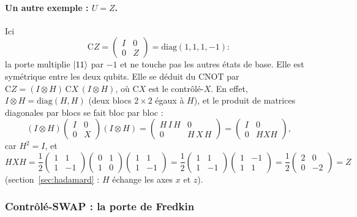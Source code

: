 \paragraph{Un autre exemple : $U=Z$.} Ici
\[
  \mathrm{C}Z=\begin{pmatrix}I&0\\0&Z\end{pmatrix}=\mathrm{diag}(1,1,1,-1) :
\]
la porte multiplie $|11\rangle$ par $-1$ et ne touche pas les autres états de base. Elle est
symétrique entre les deux qubits. Elle se déduit du CNOT par
$\mathrm{C}Z=(I\otimes H)\,\mathrm{C}X\,(I\otimes H)$, où $\mathrm{C}X$ est le contrôlé-$X$.
En effet, $I\otimes H=\mathrm{diag}(H,H)$ (deux blocs $2\times2$ égaux à $H$), et le produit de
matrices diagonales par blocs se fait bloc par bloc :
\[
  (I\otimes H)\begin{pmatrix}I&0\\0&X\end{pmatrix}(I\otimes H)
  =\begin{pmatrix}H\,I\,H&0\\0&H\,X\,H\end{pmatrix}
  =\begin{pmatrix}I&0\\0&HXH\end{pmatrix},
\]
car $H^2=I$, et
\[
  HXH=\frac12\begin{pmatrix}1&1\\1&-1\end{pmatrix}\begin{pmatrix}0&1\\1&0\end{pmatrix}\begin{pmatrix}1&1\\1&-1\end{pmatrix}
  =\frac12\begin{pmatrix}1&1\\1&-1\end{pmatrix}\begin{pmatrix}1&-1\\1&1\end{pmatrix}
  =\frac12\begin{pmatrix}2&0\\0&-2\end{pmatrix}=Z
\]
(section~\ref{sec:hadamard} : $H$ échange les axes $x$ et $z$).

\subsubsection{Contrôlé-SWAP : la porte de Fredkin}

